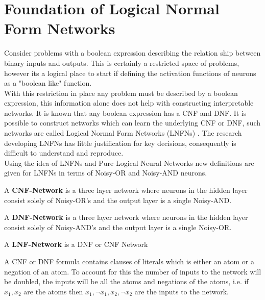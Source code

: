 \chapter{Foundation of Logical Normal Form Networks}\label{C:foundation-of-lnfns}
Consider problems with a boolean expression describing the relation ship between binary inputs and outputs. This is certainly a restricted space of problems, however its a logical place to start if defining the activation functions of neurons as a "boolean like" function.\\

With this restriction in place any problem must be described by a boolean expression, this information alone does not help with constructing interpretable networks. It is known that any boolean expression has a CNF and DNF. It is possible to construct networks which can learn the underlying CNF or DNF, such networks are called Logical Normal Form Networks (LNFNs) \cite{herrmann1996backpropagation}. The research developing LNFNs has little justification for key decisions, consequently is difficult to understand and reproduce.\\

Using the idea of LNFNs \cite{herrmann1996backpropagation} and Pure Logical Neural Networks \cite{LearningLogicalActivations} new definitions are given for LNFNs in terms of Noisy-OR and Noisy-AND neurons.

\theoremstyle{definition}
\begin{definition}
A \textbf{CNF-Network} is a three layer network where neurons in the hidden layer consist solely of Noisy-OR's and the output layer is a single Noisy-AND. 
\end{definition}

\theoremstyle{definition}
\begin{definition}
A \textbf{DNF-Network} is a three layer network where neurons in the hidden layer consist solely of Noisy-AND's and the output layer is a single Noisy-OR. 
\end{definition}

\theoremstyle{definition}
\begin{definition}
A \textbf{LNF-Network} is a DNF or CNF Network
\label{def:lnfn}
\end{definition}

A CNF or DNF formula contains clauses of literals which is either an atom or a negation of an atom. To account for this the number of inputs to the network will be doubled, the inputs will be all the atoms and negations of the atoms, i.e. if $x_1, x_2$ are the atoms then $x_1, \lnot x_1, x_2, \lnot x_2$ are the inputs to the network.\\ 

